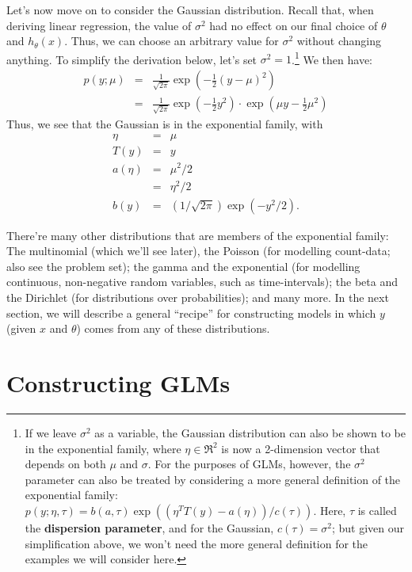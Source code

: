 \documentclass{article}
\begin{document}
Let's now move on to consider the Gaussian distribution.  Recall that, when deriving
linear regression, the value of $\sigma^2$ had no effect on our final choice of $\theta$
and $h_\theta(x)$.  Thus, we can choose an arbitrary value for $\sigma^2$ without
changing anything. To simplify the derivation below, let's
set $\sigma^2=1$.\footnote{If we leave $\sigma^2$ as a variable, the Gaussian
distribution can also be shown to be in the exponential family, where $\eta \in \Re^2$
is now a 2-dimension vector that depends on both $\mu$ and $\sigma$.  For the purposes
of GLMs, however, the $\sigma^2$ parameter can also be treated by considering
a more general definition of the exponential family:
$p(y;\eta,\tau) = b(a,\tau) \exp((\eta^T T(y) - a(\eta))/c(\tau))$.
Here, $\tau$ is called the {\bf dispersion parameter}, and for the Gaussian,
$c(\tau) = \sigma^2$; but given our simplification above, we won't need
the more general definition for the examples we will consider here.}
We then have:
\begin{eqnarray*}
p(y;\mu) &=& \frac{1}{\sqrt{2\pi}} \exp\left(-\frac{1}{2} (y-\mu)^2\right) \\
&=& \frac{1}{\sqrt{2\pi}} \exp\left(-\frac{1}{2} y^2 \right) \cdot \exp\left(\mu y - \frac{1}{2}\mu^2\right)
\end{eqnarray*}
Thus, we see that the Gaussian is in the exponential family, with
\begin{eqnarray*}
\eta &=& \mu \\
T(y)&=&y\\
a(\eta) &=& \mu^2/2 \\
  &=& \eta^2/2\\
b(y) &=& (1/\sqrt{2\pi})\exp(-y^2/2).
\end{eqnarray*}

There're many other distributions that are members of the exponential family:
The multinomial (which we'll see later), the Poisson (for modelling count-data;
also see the problem set); the gamma and the exponential (for modelling continuous,
non-negative random variables, such as time-intervals); the beta and the Dirichlet
(for distributions over probabilities); and many more.  In the next section, we
will describe a general ``recipe'' for constructing models in which $y$
(given $x$ and $\theta$) comes from any of these distributions.

\section{Constructing GLMs}
\end{document}
